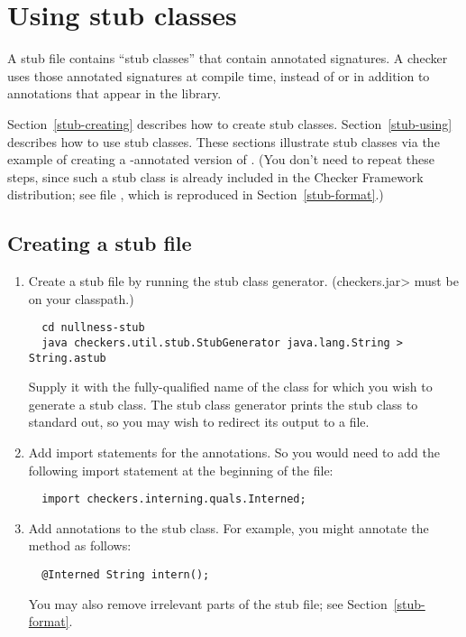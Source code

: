 \section{Using stub classes\label{stub}\label{stub-creating-and-using}}

A stub file contains ``stub classes'' that contain annotated signatures.  A
checker uses those annotated signatures at compile time, instead of or in
addition to annotations that appear in the library.

Section~\ref{stub-creating} describes how to create stub classes.
Section~\ref{stub-using} describes how to use stub classes.
These sections illustrate stub classes via the example of creating a -annotated
version of .  (You don't need to repeat these steps,
since such a stub class is already included in the Checker Framework
distribution; see file , which
is reproduced in Section~\ref{stub-format}.)


\subsection{Creating a stub file\label{stub-creating}}

\begin{enumerate}

\item
  Create a stub file by running the stub class generator.  (\<checkers.jar>
  must be on your classpath.)

\begin{Verbatim}
  cd nullness-stub
  java checkers.util.stub.StubGenerator java.lang.String > String.astub
\end{Verbatim}

  Supply it with the fully-qualified name of the class for which you wish to
  generate a stub class.  The stub class generator prints the
  stub class to standard out, so you may wish to redirect its output to a
  file.

\item
  Add import statements for the annotations.  So you would need to
add the following import statement at the beginning of the file:

\begin{Verbatim}
  import checkers.interning.quals.Interned;
\end{Verbatim}

\item
  Add annotations to the stub class.  For example, you might annotate
  the  method as follows:

\begin{Verbatim}
  @Interned String intern();
\end{Verbatim}

  You may also remove irrelevant parts of the stub file; see
  Section~\ref{stub-format}.

\end{enumerate}


